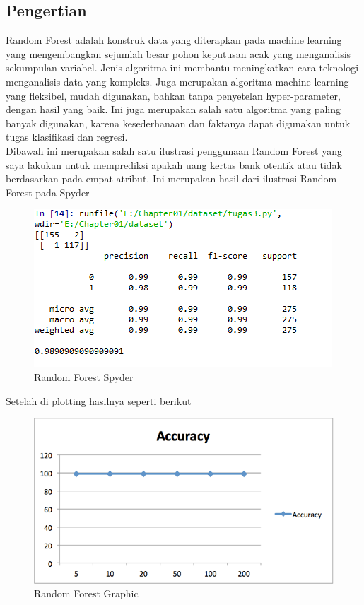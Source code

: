 \subsection{Pengertian}
Random Forest adalah konstruk data yang diterapkan pada machine learning yang mengembangkan sejumlah besar pohon keputusan acak yang menganalisis sekumpulan variabel. Jenis algoritma ini membantu meningkatkan cara teknologi menganalisis data yang kompleks. Juga merupakan algoritma machine learning yang fleksibel, mudah digunakan, bahkan tanpa penyetelan hyper-parameter, dengan hasil yang baik. Ini juga merupakan salah satu algoritma yang paling banyak digunakan, karena kesederhanaan dan faktanya dapat digunakan untuk tugas klasifikasi dan regresi.\\
Dibawah ini merupakan salah satu ilustrasi penggunaan Random Forest yang saya lakukan untuk memprediksi apakah uang kertas bank otentik atau tidak berdasarkan pada empat atribut.
Ini merupakan hasil dari ilustrasi Random Forest pada Spyder
\begin{figure}[ht]
\centering
\includegraphics[scale=0.5]{figures/teori1.png}
\caption{Random Forest Spyder}
\label{Contoh}
\end{figure}
\par
Setelah di plotting hasilnya seperti berikut
\begin{figure}[ht]
\centering
\includegraphics[scale=0.5]{figures/teori2.png}
\caption{Random Forest Graphic}
\label{Contoh}
\end{figure}

